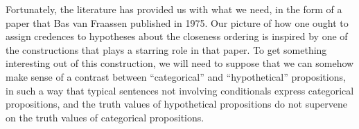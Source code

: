 \documentclass[If.tex]{subfiles}
\begin{document}
Fortunately, the literature has provided us with what we need, in the form of a paper that Bas van Fraassen published in 1975. Our picture of how one ought to assign credences to hypotheses about the closeness ordering is inspired by one of the constructions that plays a starring role in that paper. To get something interesting out of this construction, we will need to suppose that we can somehow make sense of a contrast between “categorical” and “hypothetical” propositions, in such a way that typical sentences not involving conditionals express categorical propositions, and the truth values of hypothetical propositions do not supervene on the truth values of categorical propositions.  

\end{document}
